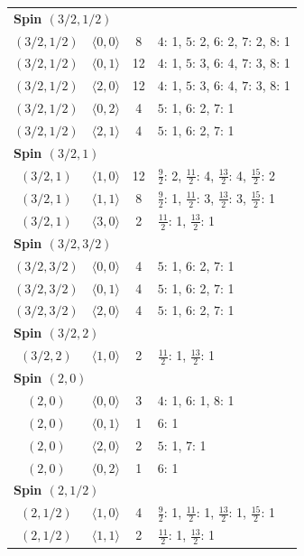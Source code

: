 \begin{longtable}{c c c p{8.8cm}}
\midrule
\multicolumn{4}{l}{\textbf{Spin $(3/2,1/2)$}}\\
$(3/2,1/2)$ & $\langle 0,0\rangle$ & 8 & $4$: 1, $5$: 2, $6$: 2, $7$: 2, $8$: 1 \\
$(3/2,1/2)$ & $\langle 0,1\rangle$ & 12 & $4$: 1, $5$: 3, $6$: 4, $7$: 3, $8$: 1 \\
$(3/2,1/2)$ & $\langle 2,0\rangle$ & 12 & $4$: 1, $5$: 3, $6$: 4, $7$: 3, $8$: 1 \\
$(3/2,1/2)$ & $\langle 0,2\rangle$ & 4 & $5$: 1, $6$: 2, $7$: 1 \\
$(3/2,1/2)$ & $\langle 2,1\rangle$ & 4 & $5$: 1, $6$: 2, $7$: 1 \\
\midrule
\multicolumn{4}{l}{\textbf{Spin $(3/2,1)$}}\\
$(3/2,1)$ & $\langle 1,0\rangle$ & 12 & $\frac{9}{2}$: 2, $\frac{11}{2}$: 4, $\frac{13}{2}$: 4, $\frac{15}{2}$: 2 \\
$(3/2,1)$ & $\langle 1,1\rangle$ & 8 & $\frac{9}{2}$: 1, $\frac{11}{2}$: 3, $\frac{13}{2}$: 3, $\frac{15}{2}$: 1 \\
$(3/2,1)$ & $\langle 3,0\rangle$ & 2 & $\frac{11}{2}$: 1, $\frac{13}{2}$: 1 \\
\midrule
\multicolumn{4}{l}{\textbf{Spin $(3/2,3/2)$}}\\
$(3/2,3/2)$ & $\langle 0,0\rangle$ & 4 & $5$: 1, $6$: 2, $7$: 1 \\
$(3/2,3/2)$ & $\langle 0,1\rangle$ & 4 & $5$: 1, $6$: 2, $7$: 1 \\
$(3/2,3/2)$ & $\langle 2,0\rangle$ & 4 & $5$: 1, $6$: 2, $7$: 1 \\
\midrule
\multicolumn{4}{l}{\textbf{Spin $(3/2,2)$}}\\
$(3/2,2)$ & $\langle 1,0\rangle$ & 2 & $\frac{11}{2}$: 1, $\frac{13}{2}$: 1 \\
\midrule
\multicolumn{4}{l}{\textbf{Spin $(2,0)$}}\\
$(2,0)$ & $\langle 0,0\rangle$ & 3 & $4$: 1, $6$: 1, $8$: 1 \\
$(2,0)$ & $\langle 0,1\rangle$ & 1 & $6$: 1 \\
$(2,0)$ & $\langle 2,0\rangle$ & 2 & $5$: 1, $7$: 1 \\
$(2,0)$ & $\langle 0,2\rangle$ & 1 & $6$: 1 \\
\midrule
\multicolumn{4}{l}{\textbf{Spin $(2,1/2)$}}\\
$(2,1/2)$ & $\langle 1,0\rangle$ & 4 & $\frac{9}{2}$: 1, $\frac{11}{2}$: 1, $\frac{13}{2}$: 1, $\frac{15}{2}$: 1 \\
$(2,1/2)$ & $\langle 1,1\rangle$ & 2 & $\frac{11}{2}$: 1, $\frac{13}{2}$: 1 \\

\end{longtable}
